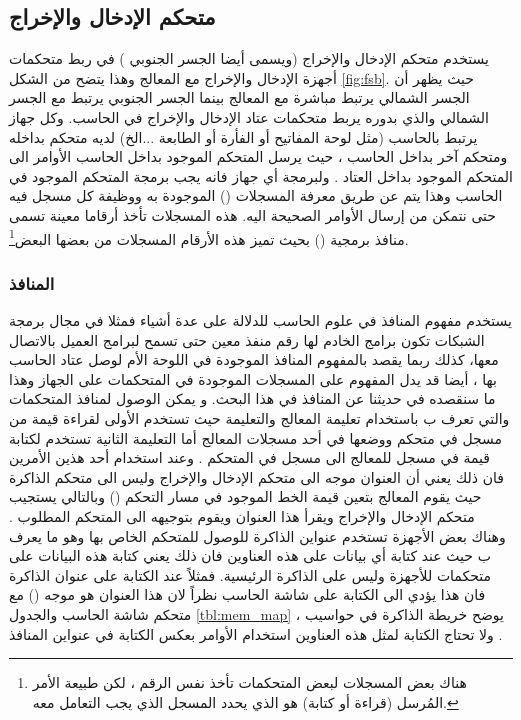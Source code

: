 \documentclass[document.tex]{subfiles}
\begin{document}
\subsection{متحكم الإدخال والإخراج}
يستخدم متحكم  الإدخال والإخراج (ويسمى أيضا الجسر الجنوبي ) في ربط متحكمات أجهزة الإدخال والإخراج مع المعالج وهذا يتضح من الشكل \ref{fig:fsb}. حيث يظهر أن الجسر الشمالي يرتبط مباشرة مع المعالج بينما الجسر الجنوبي يرتبط مع الجسر الشمالي والذي بدوره يربط متحكمات عتاد الإدخال والإخراج في الحاسب.
وكل جهاز يرتبط بالحاسب (مثل لوحة المفاتيح أو الفأرة أو الطابعة ...الخ) لديه متحكم بداخله ومتحكم آخر بداخل الحاسب ، حيث يرسل المتحكم الموجود بداخل الحاسب الأوامر الى المتحكم الموجود بداخل العتاد . ولبرمجة أي جهاز فانه يجب برمجة المتحكم الموجود في الحاسب وهذا يتم عن طريق معرفة المسجلات () الموجودة به ووظيفة كل مسجل فيه حتى نتمكن من إرسال الأوامر الصحيحة اليه. هذه المسجلات تأخذ أرقاما معينة تسمى منافذ برمجية ()  بحيث تميز هذه الأرقام المسجلات من بعضها البعض\footnote{هناك بعض المسجلات لبعض المتحكمات تأخذ نفس الرقم ، لكن طبيعة الأمر المُرسل (قراءة أو كتابة) هو الذي يحدد المسجل الذي يجب التعامل معه.}.

\subsubsection{المنافذ }
يستخدم مفهوم المنافذ في علوم الحاسب للدلالة على عدة أشياء فمثلا في مجال برمجة الشبكات تكون برامج الخادم لها رقم منفذ معين حتى تسمح لبرامج العميل بالاتصال معها، كذلك ربما يقصد بالمفهوم المنافذ الموجودة في اللوحة الأم لوصل عتاد الحاسب بها ، أيضا قد يدل المفهوم على المسجلات الموجودة في المتحكمات على الجهاز  وهذا ما سنقصده في حديثنا عن المنافذ في هذا البحث.
و يمكن الوصول لمنافذ المتحكمات والتي تعرف ب  باستخدام تعليمة المعالج  والتعليمة  حيث تستخدم الأولى لقراءة قيمة من مسجل في متحكم ووضعها في أحد مسجلات المعالج أما التعليمة الثانية تستخدم لكتابة قيمة في مسجل للمعالج الى مسجل في المتحكم . وعند استخدام أحد هذين الأمرين فان ذلك يعني أن العنوان موجه الى متحكم الإدخال والإخراج وليس الى متحكم الذاكرة حيث يقوم المعالج بتعين قيمة الخط  الموجود في مسار التحكم ()  وبالتالي يستجيب متحكم الإدخال والإخراج ويقرأ هذا العنوان ويقوم بتوجيهه الى المتحكم المطلوب . وهناك بعض الأجهزة تستخدم عنواين الذاكرة للوصول للمتحكم الخاص بها وهو ما يعرف ب  حيث عند كتابة أي بيانات على هذه العناوين فان ذلك يعني كتابة هذه البيانات على متحكمات للأجهزة وليس على الذاكرة الرئيسية. فمثلاً عند الكتابة على عنوان الذاكرة  فان هذا يؤدي الى الكتابة على شاشة الحاسب نظراً لان هذا العنوان هو موجه () مع متحكم شاشة الحاسب والجدول \ref{tbl:mem_map} يوضح خريطة الذاكرة في حواسيب ، ولا تحتاج الكتابة لمثل هذه العناوين استخدام الأوامر  بعكس الكتابة في عنواين المنافذ  .
\end{document}
